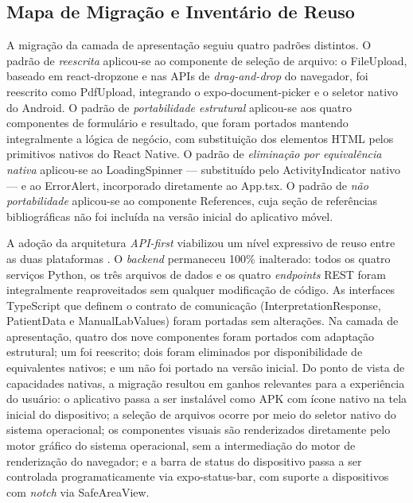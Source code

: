 \documentclass[12pt]{article}
\begin{document}
\subsection{Mapa de Migração e Inventário de Reuso}

A migração da camada de apresentação seguiu quatro padrões distintos.
O padrão de \textit{reescrita} aplicou-se ao componente de seleção de
arquivo: o FileUpload, baseado em react-dropzone e nas APIs de
\textit{drag-and-drop} do navegador, foi reescrito como PdfUpload,
integrando o expo-document-picker e o seletor nativo do Android. O padrão
de \textit{portabilidade estrutural} aplicou-se aos quatro componentes de
formulário e resultado, que foram portados mantendo integralmente a lógica
de negócio, com substituição dos elementos HTML pelos primitivos nativos
do React Native. O padrão de \textit{eliminação por equivalência nativa}
aplicou-se ao LoadingSpinner — substituído pelo ActivityIndicator nativo
— e ao ErrorAlert, incorporado diretamente ao App.tsx. O padrão de
\textit{não portabilidade} aplicou-se ao componente References, cuja seção
de referências bibliográficas não foi incluída na versão inicial do
aplicativo móvel.

A adoção da arquitetura \textit{API-first} viabilizou um nível expressivo
de reuso entre as duas plataformas \cite{rampinelli2026}. O
\textit{backend} permaneceu 100\% inalterado: todos os quatro serviços
Python, os três arquivos de dados e os quatro \textit{endpoints} REST foram
integralmente reaproveitados sem qualquer modificação de código. As
interfaces TypeScript que definem o contrato de comunicação
(InterpretationResponse, PatientData e ManualLabValues) foram portadas
sem alterações. Na camada de apresentação, quatro dos nove componentes
foram portados com adaptação estrutural; um foi reescrito; dois foram
eliminados por disponibilidade de equivalentes nativos; e um não foi
portado na versão inicial. Do ponto de vista de capacidades nativas, a
migração resultou em ganhos relevantes para a experiência do usuário: o
aplicativo passa a ser instalável como APK com ícone nativo na tela
inicial do dispositivo; a seleção de arquivos ocorre por meio do seletor
nativo do sistema operacional; os componentes visuais são renderizados
diretamente pelo motor gráfico do sistema operacional, sem a intermediação
do motor de renderização do navegador; e a barra de status do dispositivo
passa a ser controlada programaticamente via expo-status-bar, com suporte
a dispositivos com \textit{notch} via SafeAreaView.




\end{document}
